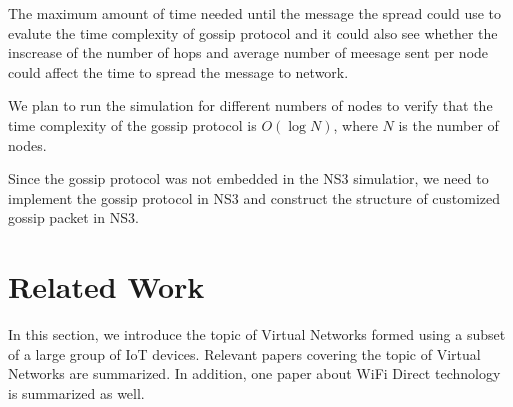 \documentclass[12pt,journal]{IEEEtran}
\begin{document}
The maximum amount of time needed until the message the spread could use to evalute the time complexity of gossip protocol and it could also see whether the inscrease of the number of hops and average number of meesage sent per node could affect the time to spread the message to network.

We plan to run the simulation for different numbers of nodes to verify that the time complexity of the gossip protocol is $O(\log N)$, where $N$ is the number of nodes.

Since the gossip protocol was not embedded in the NS3 simulatior, we need to implement the gossip protocol in NS3 and construct the structure of customized gossip packet in NS3.


\section{Related Work}
In this section, we introduce the topic of Virtual Networks formed using a subset of a large group of IoT devices. Relevant papers covering the topic of Virtual Networks are summarized. In addition, one paper about WiFi Direct technology is summarized as well.
\end{document}
